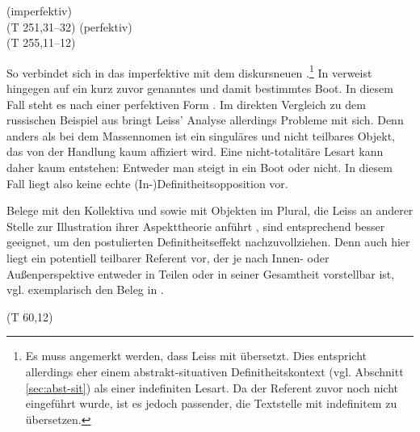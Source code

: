 \begin{exe}
	\ex \label{ex:gi-stigan}   
	\begin{xlist}
		\ex \label{ex:stigan}   (imperfektiv) \\ 
		 (T 251,31--32)
		\ex \label{ex:gistigan}   (perfektiv) \\   (T 255,11--12)
		\end{xlist}
\end{exe}
\noindent
So verbindet sich in  das imperfektive   mit dem diskursneuen .\footnote{Es muss angemerkt werden, dass Leiss  mit  übersetzt. Dies entspricht allerdings eher einem abstrakt-situativen Definitheitskontext (vgl. Abschnitt \ref{sec:abst-sit}) als einer indefiniten Lesart. Da der Referent zuvor noch nicht eingeführt wurde, ist es jedoch passender, die Textstelle mit indefinitem  zu übersetzen.} In  verweist  hingegen auf ein kurz zuvor genanntes und damit bestimmtes Boot. In diesem Fall steht es nach einer perfektiven Form .
Im direkten Vergleich zu dem russischen Beispiel aus  bringt Leiss' Analyse allerdings Probleme mit sich. Denn anders als bei dem Massennomen  ist  ein singuläres und nicht teilbares Objekt, das von der Handlung  kaum affiziert wird. Eine nicht-totalitäre Lesart kann daher kaum entstehen: Entweder man steigt in ein Boot oder nicht. In diesem Fall liegt also keine echte \mbox{(In-)}Definitheitsopposition vor. 

Belege mit den Kollektiva   und   sowie mit Objekten im Plural, die Leiss an anderer Stelle zur Illustration ihrer Aspekttheorie anführt \parencite[170ff.]{Leiss2000}, sind entsprechend besser geeignet, um den postulierten Definitheitseffekt nachzuvollziehen. Denn auch hier liegt ein potentiell teilbarer Referent vor, der je nach Innen- oder Außenperspektive entweder in Teilen oder in seiner Gesamtheit vorstellbar ist, vgl. exemplarisch den Beleg in  \parencite[170]{Leiss2000}. 


\begin{exe}
	\ex \label{ex:menigi}   (T 60,12)\\ 	
\end{exe}

